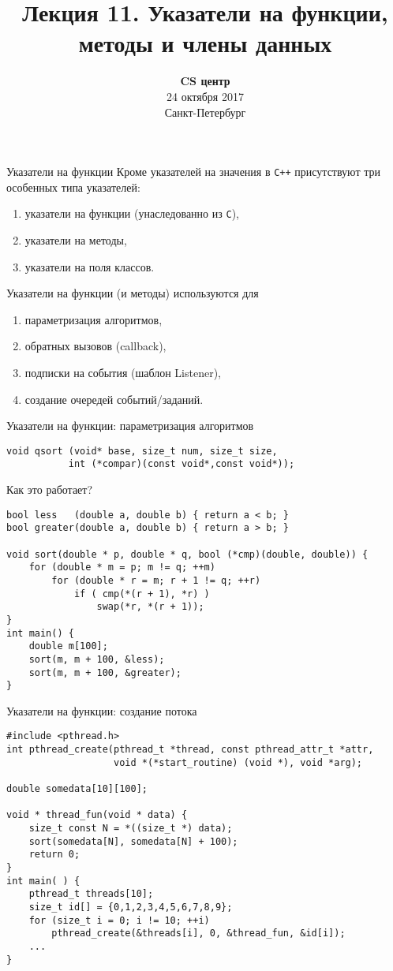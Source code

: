 \documentclass{beamer}
\title{Лекция 11. Указатели на функции, методы и члены данных}
\date{
   \textbf{CS центр}\\
   24 октября 2017 \\
   Санкт-Петербург
}
\begin{document}
\begin{frame} 
  \titlepage
\end{frame}

\begin{frame}[fragile]{Указатели на функции}
    Кроме указателей на значения в \texttt{C++} присутствуют три особенных 
    типа указателей:
    \begin{enumerate}
        \item указатели на функции (унаследованно из \texttt{C}),
        \item указатели на методы,
        \item указатели на поля классов.
    \end{enumerate}
    
    Указатели на функции (и методы) используются для
    \begin{enumerate}
        \item параметризация алгоритмов,
        \item обратных вызовов (callback),
        \item подписки на события (шаблон Listener),
        \item создание очередей событий/заданий.
    \end{enumerate}
\end{frame}

\begin{frame}[fragile]{Указатели на функции: параметризация алгоритмов}
\small
    \begin{lstlisting}
void qsort (void* base, size_t num, size_t size,
           int (*compar)(const void*,const void*));
    \end{lstlisting}

Как это работает?
    \begin{lstlisting}
bool less   (double a, double b) { return a < b; }
bool greater(double a, double b) { return a > b; }

void sort(double * p, double * q, bool (*cmp)(double, double)) {
    for (double * m = p; m != q; ++m)
        for (double * r = m; r + 1 != q; ++r)
            if ( cmp(*(r + 1), *r) )
                swap(*r, *(r + 1));
}
int main() {
    double m[100];
    sort(m, m + 100, &less);
    sort(m, m + 100, &greater);
}
    \end{lstlisting}
\end{frame}

\begin{frame}[fragile]{Указатели на функции: создание потока}
    \begin{lstlisting}
#include <pthread.h>
int pthread_create(pthread_t *thread, const pthread_attr_t *attr,
                   void *(*start_routine) (void *), void *arg);

double somedata[10][100];

void * thread_fun(void * data) {
    size_t const N = *((size_t *) data);
    sort(somedata[N], somedata[N] + 100);
    return 0;
}
int main( ) {
    pthread_t threads[10];
    size_t id[] = {0,1,2,3,4,5,6,7,8,9};
    for (size_t i = 0; i != 10; ++i)
        pthread_create(&threads[i], 0, &thread_fun, &id[i]);
    ...
}
    \end{lstlisting}
\end{frame}
 
\end{document}
